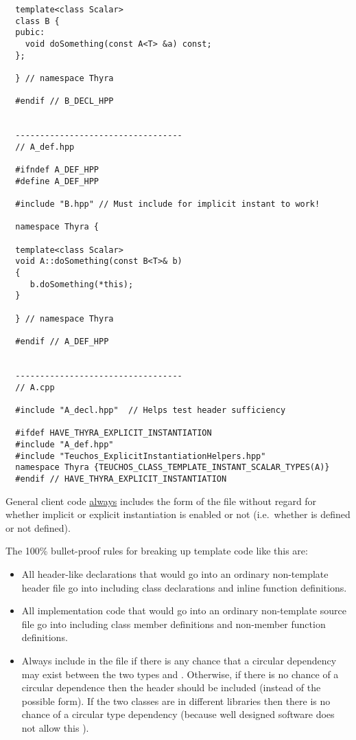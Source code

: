 \begin{itemize}
{\begin{verbatim}
  template<class Scalar>
  class B {
  pubic:
    void doSomething(const A<T> &a) const;
  };

  } // namespace Thyra

  #endif // B_DECL_HPP


  ----------------------------------
  // A_def.hpp

  #ifndef A_DEF_HPP
  #define A_DEF_HPP

  #include "B.hpp" // Must include for implicit instant to work!

  namespace Thyra {

  template<class Scalar>
  void A::doSomething(const B<T>& b)
  {
     b.doSomething(*this);
  }

  } // namespace Thyra

  #endif // A_DEF_HPP


  ----------------------------------
  // A.cpp

  #include "A_decl.hpp"  // Helps test header sufficiency

  #ifdef HAVE_THYRA_EXPLICIT_INSTANTIATION
  #include "A_def.hpp"
  #include "Teuchos_ExplicitInstantiationHelpers.hpp"
  namespace Thyra {TEUCHOS_CLASS_TEMPLATE_INSTANT_SCALAR_TYPES(A)}
  #endif // HAVE_THYRA_EXPLICIT_INSTANTIATION
\end{verbatim}}


General client code {}\underline{always} includes the {} form of
the file without regard for whether implicit or explicit instantiation is
enabled or not (i.e.\ whether {} is
defined or not defined).

The 100\% bullet-proof rules for breaking up template code like this are:

\begin{itemize}

{}\item All header-like declarations that would go into an ordinary
non-template {} header file go into {}
including class declarations and inline function definitions.

{}\item All implementation code that would go into an ordinary non-template
{} source file go into {} including class
member definitions and non-member function definitions.

{}\item Always include {} in the
{} file if there is any chance that a
circular dependency may exist between the two types
{} and {}.  Otherwise, if there is
no chance of a circular dependence then the header
{} should be included (instead of the
possible {} form).  If the two classes are in
different libraries then there is no chance of a circular type
dependency (because well designed software does not allow this
{}\cite{AgileSoftwareDevelopment}).


\end{itemize}
\end{itemize}
